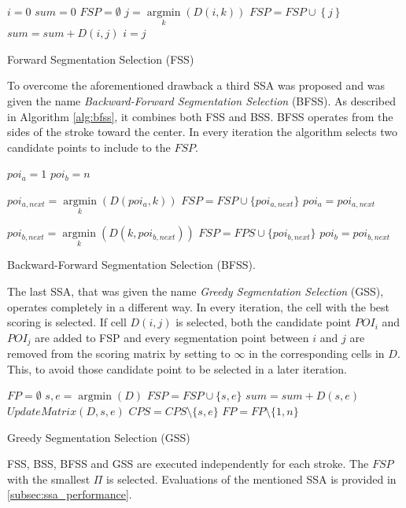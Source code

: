 \documentclass[journal,compsoc]{IEEEtran}
\begin{document}
\begin{algorithm}
$i=0$\;
$sum=0$\;
$FSP = \emptyset $\;
{
	$j = \mathop {\arg \min }\limits_k \left( {D\left( {i,k} \right)} \right)$\;
	$FSP = FSP \cup \left\{ j \right\}$\;
	$sum = sum + D\left( {i,j} \right)$\;
	$i=j$\;
}
\caption{Forward Segmentation Selection (FSS)}
\label{alg:fss}
\end{algorithm}

To overcome the aforementioned drawback a third SSA was proposed and was given the name \emph{Backward-Forward Segmentation Selection} (BFSS). As described in Algorithm \ref{alg:bfss}, it combines both FSS and BSS. BFSS operates from the sides of the stroke toward the center. In every iteration the algorithm selects two candidate points to include to the $FSP$. \\

\begin{algorithm}
$poi_{a}=1$\;
$poi_{b}=n$\;
{
	$poi_{a,next} = \mathop {\arg \min}\limits_k (D(poi_a,k))$\;
	$FSP = FSP \cup \{poi_{a,next}\}$\;
	$poi_{a}=poi_{a,next}$\;
	
	$poi_{b,next} = \mathop {\arg \min}\limits_k (D(k,poi_{b,next}))$\;
	$FSP = FPS \cup \{poi_{b,next}\}$\;	
	$poi_{b}=poi_{b,next}$\;
}
\caption{Backward-Forward Segmentation Selection (BFSS).}
\label{alg:bfss}
\end{algorithm}
  
The last SSA, that was given the name \emph{Greedy Segmentation Selection} (GSS), operates completely in a different way. In every iteration, the cell with the best scoring is selected. If cell $D(i,j)$ is selected, both the candidate point $POI_{i}$ and $POI_{j}$ are added to FSP and every segmentation point between $i$ and $j$ are removed from the scoring matrix by setting to $\infty$ in the corresponding cells in $D$. This, to avoid those candidate point to be selected in a later iteration. 

\begin{algorithm}
$FP=\emptyset$\;
{
	${s,e} = \mathop {\arg \min}(D)$\;
	$FSP = FSP \cup \{s,e\}$\;
	$sum = sum + D(s,e)$\;
	$UpdateMatrix(D,s,e)$\;
	$CPS = CPS\setminus\{s,e\}$\;
}
$FP=FP\setminus\{1,n\}$\;

\caption{Greedy Segmentation Selection (GSS)}
\label{alg:gss}
\end{algorithm}

FSS, BSS, BFSS and GSS are executed independently for each stroke. The $FSP$ with the smallest $\Pi$ is selected. Evaluations of the mentioned SSA is provided in \ref{subsec:ssa_performance}. 
\end{document}
